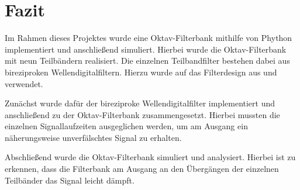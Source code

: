 %

\section{Fazit}
Im Rahmen dieses Projektes wurde eine Oktav-Filterbank mithilfe von Phython implementiert und anschließend simuliert. Hierbei wurde die Oktav-Filterbank mit neun Teilbändern realisiert. Die einzelnen Teilbandfilter bestehen dabei aus bireziproken Wellendigitalfiltern. Hierzu wurde auf das Filterdesign aus \cite{gaszi1983} und \cite{kunold1989} verwendet.\par
Zunächst wurde dafür der bireziproke Wellendigitalfilter implementiert und anschließend zu der Oktav-Filterbank zusammengesetzt. Hierbei mussten die einzelnen Signallaufzeiten ausgeglichen werden, um am Ausgang ein näherungsweise unverfälschtes Signal zu erhalten.\par
Abschließend wurde die Oktav-Filterbank simuliert und analysiert. Hierbei ist zu erkennen, dass die Filterbank am Ausgang an den Übergängen der einzelnen Teilbänder das Signal leicht dämpft.